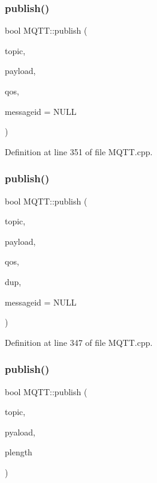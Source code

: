 \subsubsection{\texorpdfstring{publish()}{publish()}\hspace{0.1cm}{\footnotesize\ttfamily [3/10]}}
{\footnotesize\ttfamily bool M\+Q\+T\+T\+::publish (\begin{DoxyParamCaption}\item[{const char $\ast$}]{topic,  }\item[{const char $\ast$}]{payload,  }\item[{\hyperlink{class_m_q_t_t_aff501e08e20ebf26b3272fcc0e7215ff}{E\+M\+Q\+T\+T\+\_\+\+Q\+OS}}]{qos,  }\item[{uint16\+\_\+t $\ast$}]{messageid = {\ttfamily NULL} }\end{DoxyParamCaption})}



Definition at line 351 of file M\+Q\+T\+T.\+cpp.

\mbox{\label{class_m_q_t_t_abd5a453777652cd30ae3cfc4df4aa376}} 
\subsubsection{\texorpdfstring{publish()}{publish()}\hspace{0.1cm}{\footnotesize\ttfamily [4/10]}}
{\footnotesize\ttfamily bool M\+Q\+T\+T\+::publish (\begin{DoxyParamCaption}\item[{const char $\ast$}]{topic,  }\item[{const char $\ast$}]{payload,  }\item[{\hyperlink{class_m_q_t_t_aff501e08e20ebf26b3272fcc0e7215ff}{E\+M\+Q\+T\+T\+\_\+\+Q\+OS}}]{qos,  }\item[{bool}]{dup,  }\item[{uint16\+\_\+t $\ast$}]{messageid = {\ttfamily NULL} }\end{DoxyParamCaption})}



Definition at line 347 of file M\+Q\+T\+T.\+cpp.

\mbox{\label{class_m_q_t_t_a6a5dd9b7c19f2892802a222ec5d610b5}} 
\subsubsection{\texorpdfstring{publish()}{publish()}\hspace{0.1cm}{\footnotesize\ttfamily [5/10]}}
{\footnotesize\ttfamily bool M\+Q\+T\+T\+::publish (\begin{DoxyParamCaption}\item[{const char $\ast$}]{topic,  }\item[{const uint8\+\_\+t $\ast$}]{pyaload,  }\item[{unsigned int}]{plength }\end{DoxyParamCaption})}



